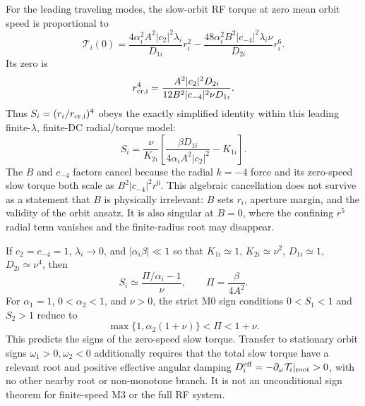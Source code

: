 For the leading traveling modes, the slow-orbit RF torque at zero mean orbit
speed is proportional to
\begin{equation}
\mathcal T_i(0)=\frac{4\alpha_i^2A^2|c_2|^2\lambda_i}{D_{1i}}r_i^2-
\frac{48\alpha_i^2B^2|c_{-4}|^2\lambda_i\nu}{D_{2i}}r_i^6.
\end{equation}
Its zero is
\begin{equation}
r_{\rm cr,i}^4=\frac{A^2|c_2|^2D_{2i}}
{12B^2|c_{-4}|^2\nu D_{1i}}.
\end{equation}
Thus $S_i=(r_i/r_{\rm cr,i})^4$ obeys the exactly simplified identity
within this leading finite-$\lambda$, finite-DC radial/torque model:
\begin{equation}
S_i=\frac{\nu}{K_{2i}}
\left[\frac{\beta D_{1i}}{4\alpha_i A^2|c_2|^2}-K_{1i}\right].
\end{equation}
The $B$ and $c_{-4}$ factors cancel because the radial $k=-4$ force and its
zero-speed slow torque both scale as $B^2|c_{-4}|^2r^6$. This algebraic
cancellation does not survive as a statement that $B$ is physically
irrelevant: $B$ sets $r_i$, aperture margin, and the validity of the orbit
ansatz. It is also singular at $B=0$, where the confining $r^5$ radial term
vanishes and the finite-radius root may disappear.

If $c_2=c_{-4}=1$, $\lambda_i\to0$, and $|\alpha_i\beta|\ll1$ so that
$K_{1i}\simeq1$, $K_{2i}\simeq\nu^2$, $D_{1i}\simeq1$,
$D_{2i}\simeq\nu^4$, then
\begin{equation}
S_i\simeq\frac{\Pi/\alpha_i-1}{\nu},\qquad
\Pi=\frac{\beta}{4A^2}.
\end{equation}
For $\alpha_1=1$, $0<\alpha_2<1$, and $\nu>0$, the strict M0 sign
conditions $0<S_1<1$ and $S_2>1$ reduce to
\begin{equation}
\max\{1,\alpha_2(1+\nu)\}<\Pi<1+\nu.
\end{equation}
This predicts the signs of the zero-speed slow torque. Transfer to stationary
orbit signs $\omega_1>0,\omega_2<0$ additionally requires that the total
slow torque have a relevant root and positive effective angular damping
$D_i^{\rm eff}=-\partial_\omega\mathcal T_i|_{\rm root}>0$, with no other
nearby root or non-monotone branch. It is not an unconditional sign theorem
for finite-speed M3 or the full RF system.
